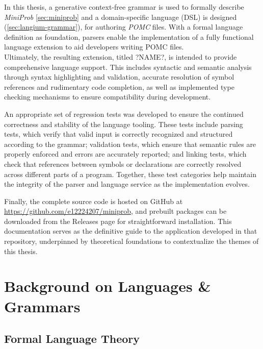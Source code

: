 In this thesis, a generative context-free grammar is used to formally describe \textit{MiniProb} \ref{sec:miniprob} and a domain-specific language (DSL) is
designed (\ref{sec:langium-grammar}), for authoring \textit{POMC} files. With a formal language definition as foundation, parsers enable the implementation of a fully functional
language extension to aid developers writing POMC files.\\
Ultimately, the resulting extension, titled ?NAME?, is intended to provide comprehensive language support. This includes syntactic and semantic analysis
through syntax highlighting and validation, accurate resolution of symbol references and rudimentary code completion, as well as implemented type checking mechanisms
to ensure compatibility during development.

An appropriate set of regression tests was developed to ensure the continued correctness and stability of the language tooling.
These tests include parsing tests, which verify that valid input is correctly recognized and structured according to the grammar; validation tests,
which ensure that semantic rules are properly enforced and errors are accurately reported; and linking tests, which check that references between symbols
or declarations are correctly resolved across different parts of a program. Together, these test categories help maintain the integrity of the parser and language service as
the implementation evolves.

Finally, the complete source code is hosted on GitHub at \url{https://github.com/e12224207/miniprob}, and prebuilt  packages can be downloaded from the Releases page for straightforward installation.
This documentation serves as the definitive guide to the application developed in that repository, underpinned by theoretical foundations to contextualize the themes of this thesis.

\chapter{Background on Languages \& Grammars}

\section{Formal Language Theory}
\label{sec:formallang}

